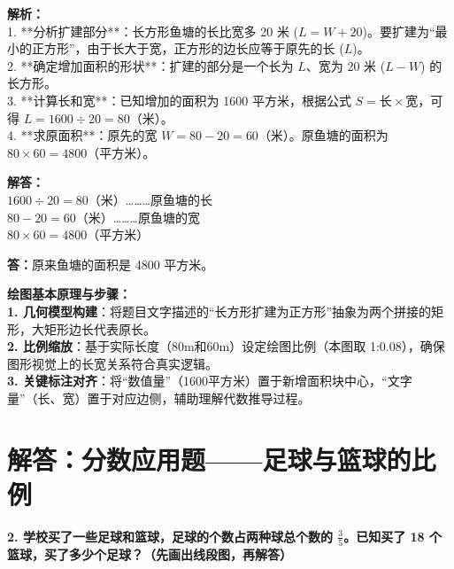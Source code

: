 \documentclass[12pt, a4paper]{ctexrep}
\begin{document}
{\small\color{gray}
\textbf{解析：}\\
1. **分析扩建部分**：长方形鱼塘的长比宽多 20 米 ($L = W + 20$)。要扩建为“最小的正方形”，由于长大于宽，正方形的边长应等于原先的长 ($L$)。\\
2. **确定增加面积的形状**：扩建的部分是一个长为 $L$、宽为 20 米 ($L - W$) 的长方形。\\
3. **计算长和宽**：已知增加的面积为 1600 平方米，根据公式 $S = \text{长} \times \text{宽}$，可得 $L = 1600 \div 20 = 80$（米）。\\
4. **求原面积**：原先的宽 $W = 80 - 20 = 60$（米）。原鱼塘的面积为 $80 \times 60 = 4800$（平方米）。
}

\vspace{0.4cm}
\noindent\textbf{解答：}\\
\indent $1600 \div 20 = 80$（米）\dots\dots\dots 原鱼塘的长\\
\indent $80 - 20 = 60$（米）\dots\dots\dots 原鱼塘的宽\\
\indent $80 \times 60 = 4800$（平方米）

\vspace{0.2cm}
\noindent\textbf{答：}原来鱼塘的面积是 4800 平方米。

\vspace{0.6cm}

{\small\color{blue!70!black}
\textbf{绘图基本原理与步骤：}\\
\textbf{1. 几何模型构建}：将题目文字描述的“长方形扩建为正方形”抽象为两个拼接的矩形，大矩形边长代表原长。\\
\textbf{2. 比例缩放}：基于实际长度（80m和60m）设定绘图比例（本图取 1:0.08），确保图形视觉上的长宽关系符合真实逻辑。\\
\textbf{3. 关键标注对齐}：将“数值量”（1600平方米）置于新增面积块中心，“文字量”（长、宽）置于对应边侧，辅助理解代数推导过程。
}


\newpage

\section{解答：分数应用题——足球与篮球的比例}

\vspace{0.4cm}

\noindent\textbf{2. 学校买了一些足球和篮球，足球的个数占两种球总个数的 $\frac{3}{5}$。已知买了 18 个篮球，买了多少个足球？（先画出线段图，再解答）}

\vspace{0.8cm}
\end{document}
